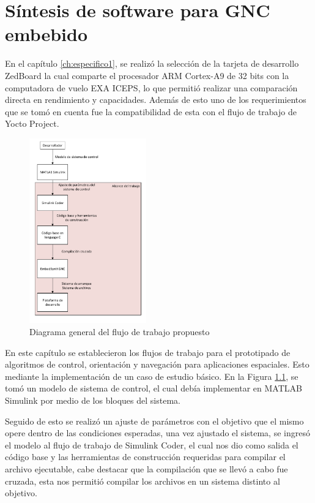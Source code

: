 \chapter{Síntesis de software para GNC embebido}
\label{ch:especifico2}

En el capítulo \ref{ch:especifico1}, se realizó la selección de la tarjeta de desarrollo ZedBoard la cual comparte el procesador ARM Cortex-A9 de 32 bits con la computadora de vuelo EXA ICEPS, lo que permitió realizar una comparación directa en rendimiento y capacidades. Además de esto uno de los requerimientos que se tomó en cuenta fue la compatibilidad de esta con el flujo de trabajo de Yocto Project.

\begin{figure}[h!]
    \centering
    \includegraphics[width=0.45\textwidth]{fig/especifico_2/Diagrama general del proyecto.pdf}
    \caption{Diagrama general del flujo de trabajo propuesto}
    \label{fig:diagrama_flujo_trabajo}
\end{figure}

En este capítulo se establecieron los flujos de trabajo para el prototipado de algoritmos de control, orientación y navegación para aplicaciones espaciales. Esto mediante la implementación de un caso de estudio básico. En la Figura \ref{fig:diagrama_flujo_trabajo}, se tomó un modelo de sistema de control, el cual debía implementar en MATLAB Simulink por medio de los bloques del sistema. 

Seguido de esto se realizó un ajuste de parámetros con el objetivo que el mismo opere dentro de las condiciones esperadas, una vez ajustado el sistema, se ingresó el modelo al flujo de trabajo de Simulink Coder, el cual nos dio como salida el código base y las herramientas de construcción requeridas para compilar el archivo ejecutable, cabe destacar que la compilación que se llevó a cabo fue cruzada, esta nos permitió compilar los archivos en un sistema distinto al objetivo. 


